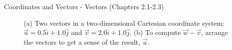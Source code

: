 \documentclass{beamer}
\begin{document}
\begin{frame}{Coordinates and Vectors - Vectors (Chapters 2.1-2.3)}
\begin{figure}
\centering
{}
\caption{\label{fig:twovectors3} (a) Two vectors in a two-dimensional Cartesian coordinate system: $\vec{u} = 0.5\hat{i}+1.0\hat{j}$ and $\vec{v} = 2.0\hat{i}+1.0\hat{j}$.  (b) To compute $\vec{w}-\vec{v}$, arrange the vectors to get a sense of the result, $\vec{u}$.}
\end{figure}
\end{frame}
\end{document}
